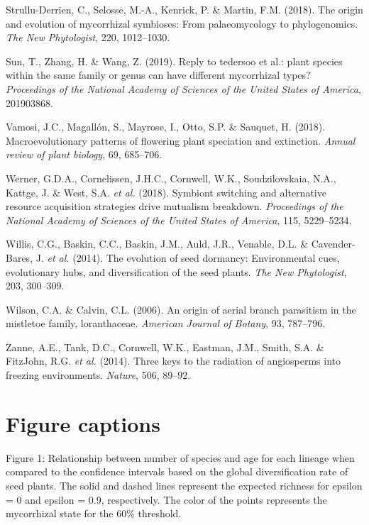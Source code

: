 \documentclass[12pt,]{article}
\begin{document}
\leavevmode\hypertarget{ref-strulluderrien_2018}{}%
Strullu-Derrien, C., Selosse, M.-A., Kenrick, P. \& Martin, F.M. (2018).
The origin and evolution of mycorrhizal symbioses: From palaeomycology
to phylogenomics. \emph{The New Phytologist}, 220, 1012--1030.

\leavevmode\hypertarget{ref-sun_2019}{}%
Sun, T., Zhang, H. \& Wang, Z. (2019). Reply to tedersoo et al.: plant
species within the same family or genus can have different mycorrhizal
types? \emph{Proceedings of the National Academy of Sciences of the
United States of America}, 201903868.

\leavevmode\hypertarget{ref-vamosi_2018}{}%
Vamosi, J.C., Magallón, S., Mayrose, I., Otto, S.P. \& Sauquet, H.
(2018). Macroevolutionary patterns of flowering plant speciation and
extinction. \emph{Annual review of plant biology}, 69, 685--706.

\leavevmode\hypertarget{ref-werner_2018}{}%
Werner, G.D.A., Cornelissen, J.H.C., Cornwell, W.K., Soudzilovskaia,
N.A., Kattge, J. \& West, S.A. \emph{et al.} (2018). Symbiont switching
and alternative resource acquisition strategies drive mutualism
breakdown. \emph{Proceedings of the National Academy of Sciences of the
United States of America}, 115, 5229--5234.

\leavevmode\hypertarget{ref-willis_2014}{}%
Willis, C.G., Baskin, C.C., Baskin, J.M., Auld, J.R., Venable, D.L. \&
Cavender-Bares, J. \emph{et al.} (2014). The evolution of seed dormancy:
Environmental cues, evolutionary hubs, and diversification of the seed
plants. \emph{The New Phytologist}, 203, 300--309.

\leavevmode\hypertarget{ref-wilson_2006}{}%
Wilson, C.A. \& Calvin, C.L. (2006). An origin of aerial branch
parasitism in the mistletoe family, loranthaceae. \emph{American Journal
of Botany}, 93, 787--796.

\leavevmode\hypertarget{ref-zanne_2014}{}%
Zanne, A.E., Tank, D.C., Cornwell, W.K., Eastman, J.M., Smith, S.A. \&
FitzJohn, R.G. \emph{et al.} (2014). Three keys to the radiation of
angiosperms into freezing environments. \emph{Nature}, 506, 89--92.

\newpage

\hypertarget{figure-captions}{%
\section{Figure captions}\label{figure-captions}}

Figure 1: Relationship between number of species and age for each
lineage when compared to the confidence intervals based on the global
diversification rate of seed plants. The solid and dashed lines
represent the expected richness for epsilon = 0 and epsilon = 0.9,
respectively. The color of the points represents the mycorrhizal state
for the 60\% threshold.
\end{document}
